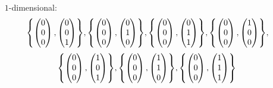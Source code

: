 \documentclass{scrreprt}
\begin{document}
\begin{enumerate}[(a)]
\begin{itemize}
  \newpage
  \item[$1$-dimensional:]
    \[
      \qty{
        \begin{pmatrix} 0 \\ 0 \\ 0 \end{pmatrix},
        \begin{pmatrix} 0 \\ 0 \\ 1 \end{pmatrix}
      },
      \qty{
        \begin{pmatrix} 0 \\ 0 \\ 0 \end{pmatrix},
        \begin{pmatrix} 0 \\ 1 \\ 0 \end{pmatrix}
      },
      \qty{
        \begin{pmatrix} 0 \\ 0 \\ 0 \end{pmatrix},
        \begin{pmatrix} 0 \\ 1 \\ 1 \end{pmatrix}
      },
      \qty{
        \begin{pmatrix} 0 \\ 0 \\ 0 \end{pmatrix},
        \begin{pmatrix} 1 \\ 0 \\ 0 \end{pmatrix}
      },
    \]
    \[
      \qty{
        \begin{pmatrix} 0 \\ 0 \\ 0 \end{pmatrix},
        \begin{pmatrix} 1 \\ 0 \\ 1 \end{pmatrix}
      },
      \qty{
        \begin{pmatrix} 0 \\ 0 \\ 0 \end{pmatrix},
        \begin{pmatrix} 1 \\ 1 \\ 0 \end{pmatrix}
      },
      \qty{
        \begin{pmatrix} 0 \\ 0 \\ 0 \end{pmatrix},
        \begin{pmatrix} 1 \\ 1 \\ 1 \end{pmatrix}
      }
    \]


\end{itemize}
\end{enumerate}
\end{document}
